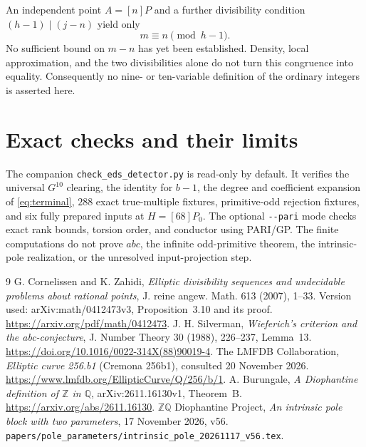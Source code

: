 \documentclass[11pt]{article}
\newcommand{\Q}{\mathbb Q}
\newcommand{\Z}{\mathbb Z}
\begin{document}
An independent point \(A=[n]P\) and a further divisibility
condition \((h-1)\mid(j-n)\) yield only
\[
                              m\equiv n\pmod{h-1}.
\]
No sufficient bound on \(m-n\) has yet been established.
Density, local approximation, and the two divisibilities alone
do not turn this congruence into equality.
Consequently no nine- or ten-variable definition of the
ordinary integers is asserted here.

\section{Exact checks and their limits}

The companion \nolinkurl{check_eds_detector.py} is read-only by
default. It verifies the universal \(G^{10}\) clearing,
the identity for \(b-1\), the degree and coefficient expansion
of \eqref{eq:terminal}, \(288\) exact true-multiple fixtures,
primitive-odd rejection fixtures, and six fully prepared
inputs at \(H=[68]P_0\).
The optional \nolinkurl{--pari} mode checks exact rank bounds,
torsion order, and conductor using PARI/GP.
The finite computations do not prove \(abc\), the infinite
odd-primitive theorem, the intrinsic-pole realization, or
the unresolved input-projection step.

\begin{thebibliography}{9}
G. Cornelissen and K. Zahidi,
\emph{Elliptic divisibility sequences and undecidable problems about
rational points}, J. reine angew. Math. 613 (2007), 1--33.
Version used: arXiv:math/0412473v3, Proposition~3.10 and its proof.
\url{https://arxiv.org/pdf/math/0412473}.
J. H. Silverman, \emph{Wieferich's criterion and the abc-conjecture},
J. Number Theory 30 (1988), 226--237, Lemma~13.
\url{https://doi.org/10.1016/0022-314X(88)90019-4}.
The LMFDB Collaboration, \emph{Elliptic curve 256.b1}
(Cremona 256b1), consulted 20 November 2026.
\url{https://www.lmfdb.org/EllipticCurve/Q/256/b/1}.
A. Burungale, \emph{A Diophantine definition of \(\Z\) in \(\Q\)},
arXiv:2611.16130v1, Theorem~B.
\url{https://arxiv.org/abs/2611.16130}.
\(\Z\Q\) Diophantine Project, \emph{An intrinsic pole block with two
parameters}, 17 November 2026, v56.
\nolinkurl{papers/pole_parameters/intrinsic_pole_20261117_v56.tex}.
\end{thebibliography}
\end{document}
